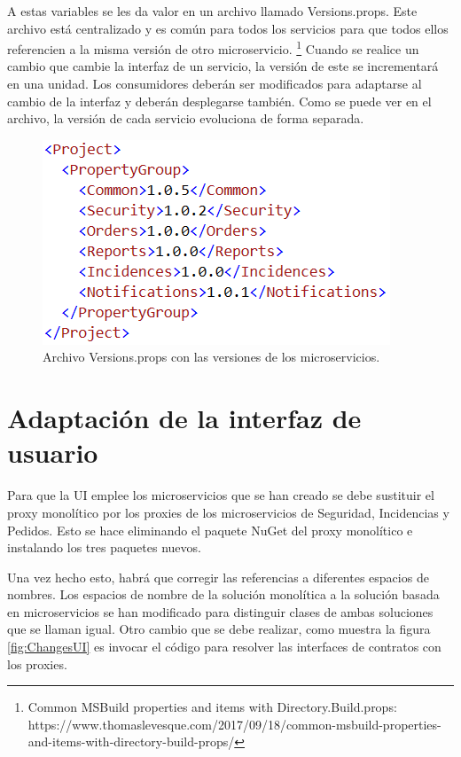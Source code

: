 \documentclass[11pt,spanish,listoffigures]{tfgetsinf}
\begin{document}
A estas variables se les da valor en un archivo llamado Versions.props. Este archivo está centralizado y es común para todos los servicios para que todos ellos referencien a la misma versión de otro microservicio. \footnote{ Common MSBuild properties and items with Directory.Build.props: https://www.thomaslevesque.com/2017/09/18/common-msbuild-properties-and-items-with-directory-build-props/} Cuando se realice un cambio que cambie la interfaz de un servicio, la versión de este se incrementará en una unidad. Los consumidores deberán ser modificados para adaptarse al cambio de la interfaz y deberán desplegarse también. Como se puede ver en el archivo, la versión de cada servicio evoluciona de forma separada.

\begin{figure}[h]
\centering
\includegraphics[scale=0.9]{Versionsprops}
\caption{Archivo Versions.props con las versiones de los microservicios.}
\end{figure}

\section{Adaptación de la interfaz de usuario}

Para que la UI emplee los microservicios que se han creado se debe sustituir el proxy monolítico por los proxies de los microservicios de Seguridad, Incidencias y Pedidos. Esto se hace eliminando el paquete NuGet del proxy monolítico e instalando los tres paquetes nuevos.

Una vez hecho esto, habrá que corregir las referencias a diferentes espacios de nombres. Los espacios de nombre de la solución monolítica a la solución basada en microservicios se han modificado para distinguir clases de ambas soluciones que se llaman igual. Otro cambio que se debe realizar, como muestra la figura \ref{fig:ChangesUI} es invocar el código para resolver las interfaces de contratos con los proxies.
\end{document}
